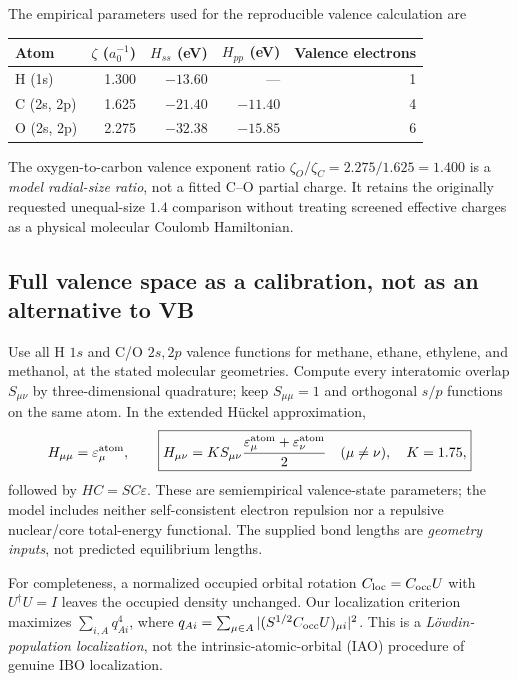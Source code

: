 \documentclass[11pt,letterpaper]{article}
\begin{document}
The empirical parameters used for the reproducible valence calculation are
\begin{center}\small
\begin{tabular}{lrrrr}
\toprule
Atom & $\zeta$ ($a_0^{-1}$) & $H_{ss}$ (eV) & $H_{pp}$ (eV) & Valence electrons\\\midrule
H (1s) & 1.300 & $-13.60$ & --- & 1\\
C (2s, 2p) & 1.625 & $-21.40$ & $-11.40$ & 4\\
O (2s, 2p) & 2.275 & $-32.38$ & $-15.85$ & 6\\\bottomrule
\end{tabular}
\end{center}
The oxygen-to-carbon valence exponent ratio $\zeta_O/\zeta_C=2.275/1.625=1.400$ is a \emph{model radial-size ratio}, not a fitted C--O partial charge. It retains the originally requested unequal-size $1.4$ comparison without treating screened effective charges as a physical molecular Coulomb Hamiltonian.

\subsection{Full valence space as a calibration, not as an alternative to VB}
Use all H $1s$ and C/O $2s,2p$ valence functions for methane, ethane, ethylene, and methanol, at the stated molecular geometries. Compute every interatomic overlap $S_{\mu\nu}$ by three-dimensional quadrature; keep $S_{\mu\mu}=1$ and orthogonal $s/p$ functions on the same atom. In the extended H\"uckel approximation,
\begin{equation}\label{eq:eht}
H_{\mu\mu}=\varepsilon_\mu^{\rm atom},\qquad
\boxed{H_{\mu\nu}=K S_{\mu\nu}\frac{\varepsilon_\mu^{\rm atom}+\varepsilon_\nu^{\rm atom}}2\quad (\mu\ne\nu),\quad K=1.75,}
\end{equation}
followed by $HC=SC\varepsilon$. These are semiempirical valence-state parameters; the model includes neither self-consistent electron repulsion nor a repulsive nuclear/core total-energy functional. The supplied bond lengths are \emph{geometry inputs}, not predicted equilibrium lengths.

For completeness, a normalized occupied orbital rotation $C_{\rm loc}=C_{\rm occ}U$ with $U^\dagger U=I$ leaves the occupied density unchanged. Our localization criterion maximizes $\sum_{i,A}q_{Ai}^4$, where $q_{Ai}=\sum_{\mu\in A}|(S^{1/2}C_{\rm occ}U)_{\mu i}|^2$. This is a \emph{L\"owdin-population localization}, not the intrinsic-atomic-orbital (IAO) procedure of genuine IBO localization.
\end{document}
